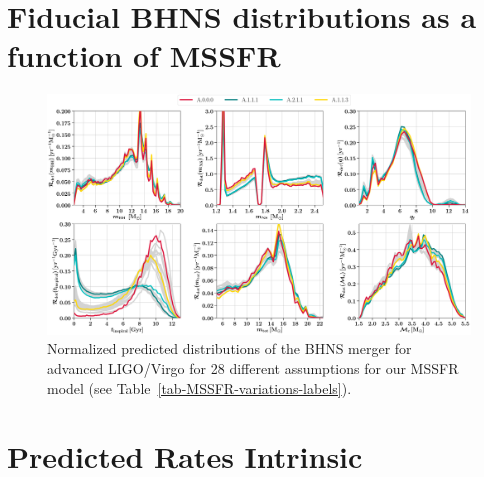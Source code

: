 \documentclass[twocolumn]{aastex63}
\newcommand\bhnsSingle{BHNS\xspace}
\begin{document}
\section{Fiducial \bhnsSingle distributions as a function of \ac{MSSFR}}


\begin{figure}
\label{fig:MSSFRvariationsPlot}
    \centering
\includegraphics[width=1.0\textwidth]{../PlottingScripts/4_MSSFR_observed/ObservedDistributionsFiducial_MSSFR_gaussianKDE_highlight.png} %
    \caption{Normalized predicted distributions of the \bhnsSingle merger for advanced LIGO/Virgo for 28 different assumptions for our \ac{MSSFR} model (see Table~\ref{tab-MSSFR-variations-labels}).  }%
\end{figure}
%




\section{Predicted Rates Intrinsic }
\label{sec:app-predicted-rates-intrinsic}


\end{document}

